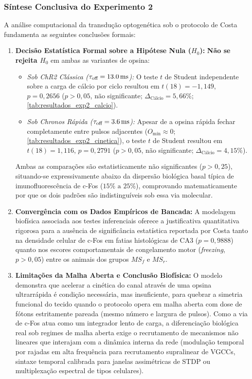 \documentclass[11pt,a4paper,article,brazil]{abntex2}
\begin{document}
\subsubsection{Síntese Conclusiva do Experimento 2}
A análise computacional da transdução optogenética sob o protocolo de Costa \cite{costa2026} fundamenta as seguintes conclusões formais:
\begin{enumerate}
    \item \textbf{Decisão Estatística Formal sobre a Hipótese Nula ($H_0$):} \textbf{Não se rejeita $H_0$} em ambas as variantes de opsina:
          \begin{itemize}
              \item \emph{Sob ChR2 Clássica ($\tau_{\text{off}} = \qty{13{,}0}{\milli\second}$):} O teste $t$ de Student independente sobre a carga de cálcio por ciclo resultou em $t(18) = -1{,}149$, $p = 0{,}2656$ ($p > 0{,}05$, não significante; $\Delta_{\text{Cálcio}} = 5{,}66\%$; \cref{tab:resultados_exp2_calcio}).
              \item \emph{Sob Chronos Rápida ($\tau_{\text{off}} = \qty{3{,}6}{\milli\second}$):} Apesar de a opsina rápida fechar completamente entre pulsos adjacentes ($O_{\text{mín}} \approx 0$; \cref{tab:resultados_exp2_cinetica}), o teste $t$ de Student resultou em $t(18) = 1{,}116$, $p = 0{,}2791$ ($p > 0{,}05$, não significante; $\Delta_{\text{Cálcio}} = 4{,}15\%$).
          \end{itemize}
          Ambas as comparações são estatisticamente não significantes ($p > 0{,}25$), situando-se expressivamente abaixo da dispersão biológica basal típica de imunofluorescência de c-Fos ($15\%\text{ a }25\%$), comprovando matematicamente por que os dois padrões são indistinguíveis sob essa via molecular.
    \item \textbf{Convergência com os Dados Empíricos de Bancada:} A modelagem biofísica associada aos testes inferenciais oferece a justificativa quantitativa rigorosa para a ausência de significância estatística reportada por Costa \cite{costa2026} tanto na densidade celular de c-Fos em fatias histológicas de CA3 ($p = 0{,}9888$) quanto nos escores comportamentais de congelamento motor (\emph{freezing}, $p > 0{,}05$) entre os animais dos grupos $MS_f$ e $MS_r$.
    \item \textbf{Limitações da Malha Aberta e Conclusão Biofísica:} O modelo demonstra que acelerar a cinética do canal através de uma opsina ultrarrápida é condição necessária, mas insuficiente, para quebrar a simetria funcional do tecido quando o protocolo opera em malha aberta com dose de fótons estritamente pareada (mesmo número e largura de pulsos). Como a via de c-Fos atua como um integrador lento de carga, a diferenciação biológica real sob regimes de malha aberta exige o recrutamento de mecanismos não lineares que interajam com a dinâmica interna da rede (modulação temporal por rajadas em alta frequência para recrutamento supralinear de VGCCs, sintaxe temporal calibrada para janelas assimétricas de STDP ou multiplexação espectral de tipos celulares).
\end{enumerate}
\end{document}
